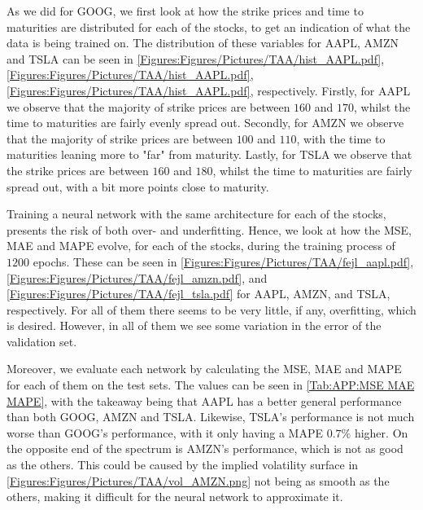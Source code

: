 As we did for GOOG, we first look at how the strike prices and time to maturities are distributed for each of the stocks, to get an indication of what the data is being trained on. The distribution of these variables for AAPL, AMZN and TSLA can be seen in \autoref{Figures:Figures/Pictures/TAA/hist_AAPL.pdf}, \autoref{Figures:Figures/Pictures/TAA/hist_AAPL.pdf}, \autoref{Figures:Figures/Pictures/TAA/hist_AAPL.pdf}, respectively. Firstly, for AAPL we observe that the majority of strike prices are between $160$ and $170$, whilst the time to  maturities are fairly evenly spread out. Secondly, for AMZN we observe that the majority of strike prices are between $100$ and $110$, with the time to maturities leaning more to "far" from maturity. Lastly, for TSLA we observe that the strike prices are between $160$ and $180$, whilst the time to maturities are fairly spread out, with a bit more points close to maturity.

Training a neural network with the same architecture for each of the stocks, presents the risk of both over- and underfitting. Hence, we look at how the MSE, MAE and MAPE evolve, for each of the stocks, during the training process of $1200$ epochs. These can be seen in \autoref{Figures:Figures/Pictures/TAA/fejl_aapl.pdf}, \autoref{Figures:Figures/Pictures/TAA/fejl_amzn.pdf}, and \autoref{Figures:Figures/Pictures/TAA/fejl_tsla.pdf} for AAPL, AMZN, and TSLA, respectively. For all of them there seems to be very little, if any, overfitting, which is desired. However, in all of them we see some variation in the error of the validation set. 

Moreover, we evaluate each network by calculating the MSE, MAE and MAPE for each of them on the test sets. The values can be seen in \autoref{Tab:APP:MSE MAE MAPE}, with the takeaway being that AAPL has a better general performance than both GOOG, AMZN and TSLA. Likewise, TSLA's performance is not much worse than GOOG's performance, with it only having a MAPE $0.7\%$ higher. On the opposite end of the spectrum is AMZN's performance, which is not as good as the others. This could be caused by the implied volatility surface in \autoref{Figures:Figures/Pictures/TAA/vol_AMZN.png} not being as smooth as the others, making it difficult for the neural network to approximate it.


